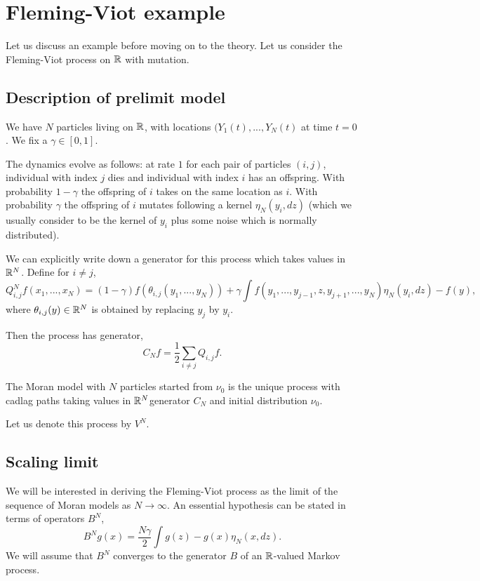 \documentclass{article}
\begin{document}
\section{Fleming-Viot example}
Let us discuss an example before moving on to the theory. Let us consider the Fleming-Viot process on $\mathbb{R}$ with mutation. 
\subsection{Description of prelimit model}
We have $N$ particles living on $\mathbb{R}$, with locations $(Y_1(t),...,Y_N(t)$ at time $t=0$. We fix a $\gamma\in[0,1]$.

The dynamics evolve as follows: at rate $1$ for each pair of particles $(i,j)$, individual with index $j$ dies 
and individual with index $i$ has an offspring.
With probability $1-\gamma$ the offspring of $i$ takes on the same location as $i$.
With probability $\gamma$ the offspring of $i$ mutates following a kernel $\eta_N(y_i,dz)$ (which we usually consider to be the kernel of $y_i$
plus some noise which is normally distributed).

We can explicitly write down a generator for this process which takes values in $\mathbb{R}^N$. 
Define for $i\neq j$,
    $$Q_{i,j}^Nf(x_1,...,x_N)=(1-\gamma)f(\theta_{i,j}(y_1,...,y_N))+\gamma\int f(y_1,...,y_{j-1},z,y_{j+1},...,y_N)\eta_N(y_i,dz)-f(y),$$
where $\theta_{i,j}(y)\in\mathbb{R}^N$ is obtained by replacing $y_j$ by $y_i$.

Then the process has generator,
\begin{equation*}
    C_Nf=\frac{1}{2}\sum_{i\neq j}Q_{i,j}f.
\end{equation*}
\begin{dfn}
    The Moran model with $N$ particles started from $\nu_0$ is the unique process with cadlag paths taking values in $\mathbb{R}^N$generator $C_N$ and initial distribution $\nu_0$. 
\end{dfn}
Let us denote this process by $V^N$.

\subsection{Scaling limit}
We will be interested in deriving the Fleming-Viot process as the limit of the sequence of Moran models as $N\rightarrow\infty$.
An essential hypothesis can be stated in terms of operators $B^N$,
\begin{equation*}
    B^Ng(x)=\frac{N\gamma}{2}\int g(z)-g(x)\eta_N(x,dz).
\end{equation*}
We will assume that $B^N$ converges to the generator $B$ of an $\mathbb{R}$-valued Markov process.
\end{document}
